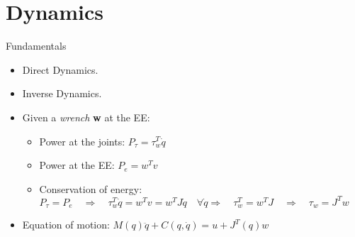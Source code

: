 \section{Dynamics}

\begin{frame}{Fundamentals}
    \begin{itemize}
        \item Direct Dynamics.
        \item Inverse Dynamics.
        \item Given a \textit{wrench} \textbf{w} at the EE:
        \begin{itemize}
            \item Power at the joints: $P_{\tau}=\tau_w^T\dot{q}$
            \item Power at the EE: $P_e=w^Tv$
            \item Conservation of energy: \\
            \vspace{2mm}
            $P_{\tau}=P_e \quad \Rightarrow \quad  \tau_w^T\dot{q}=w^Tv=w^TJ\dot{q} \quad \forall\dot{q}\Rightarrow \quad  \tau_w^T=w^TJ \quad \Rightarrow \quad \tau_w=J^Tw $
        \end{itemize}
        \vspace{1mm}
        \item Equation of motion: $ M(q)\ddot{q}+C(q,\dot{q})=u+J^T(q)w$
    \end{itemize}
\end{frame}

